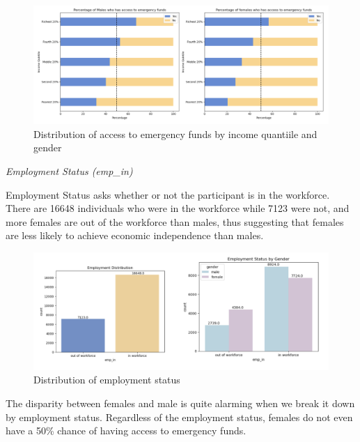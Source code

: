 \documentclass[12pt]{article}
\begin{document}
\begin{figure}

{\centering \includegraphics[width=1\linewidth]{graphs/employ_graph7} 

}

\caption{Distribution of access to emergency funds by income quantiile and gender}\label{fig:unnamed-chunk-9}
\end{figure}

\emph{Employment Status (emp\_in)}

Employment Status asks whether or not the participant is in the
workforce. There are 16648 individuals who were in the workforce while
7123 were not, and more females are out of the workforce than males,
thus suggesting that females are less likely to achieve economic
independence than males.

\begin{figure}

{\centering \includegraphics[width=1\linewidth]{graphs/employ_graph8} 

}

\caption{Distribution of employment status}\label{fig:unnamed-chunk-10}
\end{figure}

The disparity between females and male is quite alarming when we break
it down by employment status. Regardless of the employment status,
females do not even have a 50\% chance of having access to emergency
funds.
\end{document}
